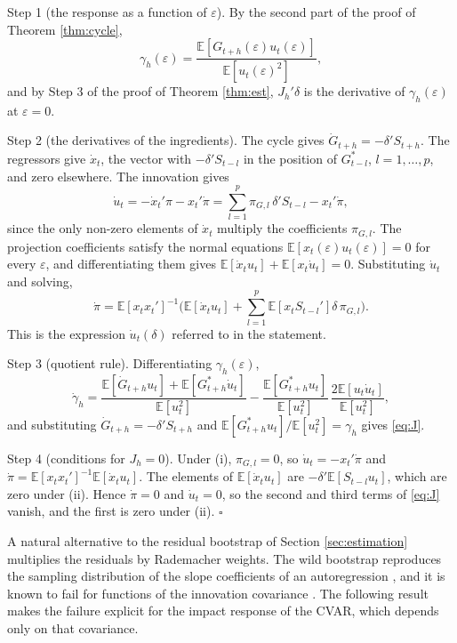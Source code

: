 \documentclass[12pt,a4paper]{article}
\theoremstyle{definition}
\newcommand{\E}{\mathbb{E}}
\begin{document}
Step 1 (the response as a function of $\varepsilon$). By the second part of the proof of Theorem \ref{thm:cycle},
\[
\gamma_h(\varepsilon)=\frac{\E[G_{t+h}(\varepsilon)u_t(\varepsilon)]}{\E[u_t(\varepsilon)^2]},
\]
and by Step 3 of the proof of Theorem \ref{thm:est}, $J_h'\delta$ is the derivative of $\gamma_h(\varepsilon)$ at $\varepsilon=0$.

Step 2 (the derivatives of the ingredients). The cycle gives $\dot G_{t+h}=-\delta'S_{t+h}$. The regressors give $\dot x_t$, the vector with $-\delta'S_{t-l}$ in the position of $G^\ast_{t-l}$, $l=1,\dots,p$, and zero elsewhere. The innovation gives
\[
\dot u_t=-\dot x_t'\pi-x_t'\dot\pi=\sum_{l=1}^p\pi_{G,l}\,\delta'S_{t-l}-x_t'\dot\pi ,
\]
since the only non-zero elements of $\dot x_t$ multiply the coefficients $\pi_{G,l}$. The projection coefficients satisfy the normal equations $\E[x_t(\varepsilon)u_t(\varepsilon)]=0$ for every $\varepsilon$, and differentiating them gives $\E[\dot x_tu_t]+\E[x_t\dot u_t]=0$. Substituting $\dot u_t$ and solving,
\[
\dot\pi=\E[x_tx_t']^{-1}\Big(\E[\dot x_tu_t]+\sum_{l=1}^p\E[x_tS_{t-l}']\delta\,\pi_{G,l}\Big).
\]
This is the expression $\dot u_t(\delta)$ referred to in the statement.

Step 3 (quotient rule). Differentiating $\gamma_h(\varepsilon)$,
\[
\dot\gamma_h=\frac{\E[\dot G_{t+h}u_t]+\E[G^\ast_{t+h}\dot u_t]}{\E[u_t^2]}-\frac{\E[G^\ast_{t+h}u_t]}{\E[u_t^2]}\,\frac{2\E[u_t\dot u_t]}{\E[u_t^2]},
\]
and substituting $\dot G_{t+h}=-\delta'S_{t+h}$ and $\E[G^\ast_{t+h}u_t]/\E[u_t^2]=\gamma_h$ gives \eqref{eq:J}.

Step 4 (conditions for $J_h=0$). Under (i), $\pi_{G,l}=0$, so $\dot u_t=-x_t'\dot\pi$ and $\dot\pi=\E[x_tx_t']^{-1}\E[\dot x_tu_t]$. The elements of $\E[\dot x_tu_t]$ are $-\delta'\E[S_{t-l}u_t]$, which are zero under (ii). Hence $\dot\pi=0$ and $\dot u_t=0$, so the second and third terms of \eqref{eq:J} vanish, and the first is zero under (ii). $\square$

A natural alternative to the residual bootstrap of Section \ref{sec:estimation} multiplies the residuals by Rademacher weights. The wild bootstrap reproduces the sampling distribution of the slope coefficients of an autoregression \citep{goncalveskilian2004}, and it is known to fail for functions of the innovation covariance \citep{bruggemann2016inference}. The following result makes the failure explicit for the impact response of the CVAR, which depends only on that covariance.
\end{document}
